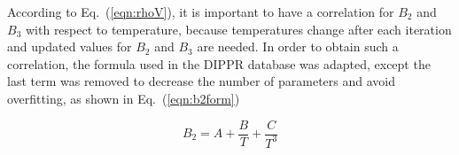 \documentclass[5p,times]{elsarticle}
\begin{document}



According to Eq.~(\ref{eqn:rhoV}), it is important to have a correlation for $B_2$ and $B_3$ with respect to temperature, because temperatures change after each iteration and updated values for $B_2$ and $B_3$ are needed. In order to obtain such a correlation, the formula used in the DIPPR \cite{DIPPR2004} database was adapted, except the last term was removed to decrease the number of parameters and avoid overfitting, as shown in Eq.~(\ref{eqn:b2form}) 

\begin{equation}
B_2=A+\frac{B}{T}+\frac{C}{T^3} \label{eqn:b2form}
\end{equation}
\end{document}
